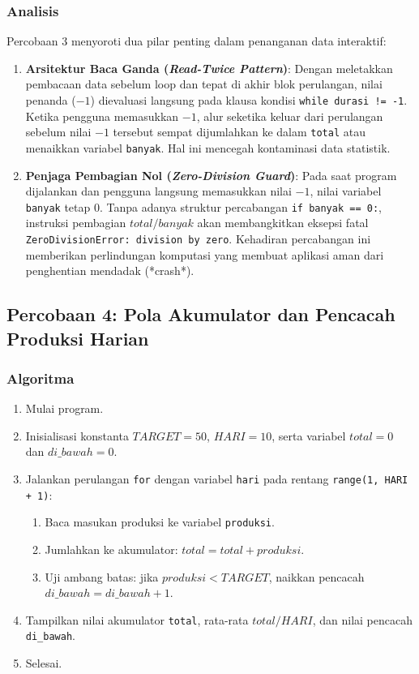 \documentclass[12pt,a4paper]{article}
\begin{document}
\subsubsection{Analisis}
Percobaan 3 menyoroti dua pilar penting dalam penanganan data interaktif:
\begin{enumerate}
    \item \textbf{Arsitektur Baca Ganda (\textit{Read-Twice Pattern})}: Dengan meletakkan pembacaan data sebelum loop dan tepat di akhir blok perulangan, nilai penanda ($-1$) dievaluasi langsung pada klausa kondisi \texttt{while durasi != -1}. Ketika pengguna memasukkan $-1$, alur seketika keluar dari perulangan sebelum nilai $-1$ tersebut sempat dijumlahkan ke dalam \texttt{total} atau menaikkan variabel \texttt{banyak}. Hal ini mencegah kontaminasi data statistik.
    \item \textbf{Penjaga Pembagian Nol (\textit{Zero-Division Guard})}: Pada saat program dijalankan dan pengguna langsung memasukkan nilai $-1$, nilai variabel \texttt{banyak} tetap 0. Tanpa adanya struktur percabangan \texttt{if banyak == 0:}, instruksi pembagian $total / banyak$ akan membangkitkan eksepsi fatal \texttt{ZeroDivisionError: division by zero}. Kehadiran percabangan ini memberikan perlindungan komputasi yang membuat aplikasi aman dari penghentian mendadak (*crash*).
\end{enumerate}

\subsection{Percobaan 4: Pola Akumulator dan Pencacah Produksi Harian}
\subsubsection{Algoritma}
\begin{enumerate}
    \item Mulai program.
    \item Inisialisasi konstanta $TARGET = 50$, $HARI = 10$, serta variabel $total = 0$ dan $di\_bawah = 0$.
    \item Jalankan perulangan \texttt{for} dengan variabel \texttt{hari} pada rentang \texttt{range(1, HARI + 1)}:
    \begin{enumerate}[label=\alph*.]
        \item Baca masukan produksi ke variabel \texttt{produksi}.
        \item Jumlahkan ke akumulator: $total = total + produksi$.
        \item Uji ambang batas: jika $produksi < TARGET$, naikkan pencacah $di\_bawah = di\_bawah + 1$.
    \end{enumerate}
    \item Tampilkan nilai akumulator \texttt{total}, rata-rata $total / HARI$, dan nilai pencacah \texttt{di\_bawah}.
    \item Selesai.
\end{enumerate}
\end{document}
